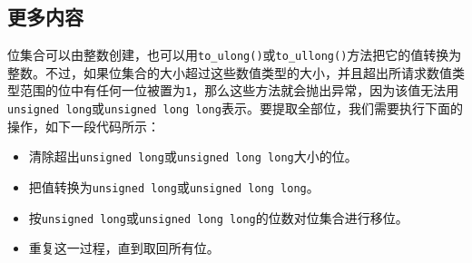 
\subsection{更多内容}



位集合可以由整数创建，也可以用\texttt{to\_\allowbreak{}ulong()}或\texttt{to\_\allowbreak{}ullong()}方法把它的值转换为整数。不过，如果位集合的大小超过这些数值类型的大小，并且超出所请求数值类型范围的位中有任何一位被置为\texttt{1}，那么这些方法就会抛出异常，因为该值无法用\texttt{unsigned long}或\texttt{unsigned long long}表示。要提取全部位，我们需要执行下面的操作，如下一段代码所示：



\begin{itemize}
\item 清除超出\texttt{unsigned long}或\texttt{unsigned long long}大小的位。



\item 把值转换为\texttt{unsigned long}或\texttt{unsigned long long}。



\item 按\texttt{unsigned long}或\texttt{unsigned long long}的位数对位集合进行移位。



\item 重复这一过程，直到取回所有位。




\end{itemize}
